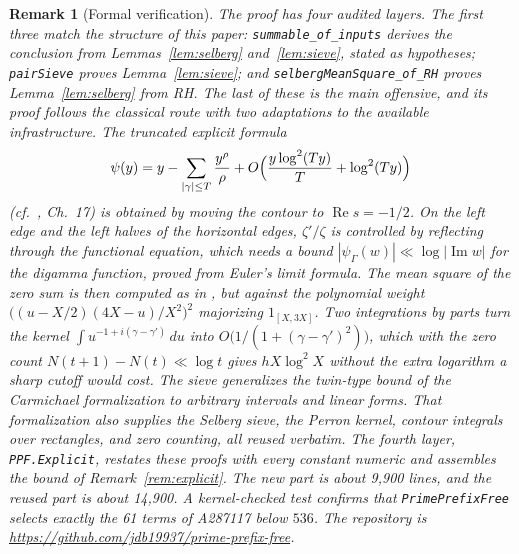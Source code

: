 \documentclass[11pt]{amsart}
\newtheorem{remark}[lemma]{Remark}
\begin{document}
\begin{remark}[Formal verification]
The proof has four audited layers. The first three match the structure
of this paper: \texttt{summable\_of\_inputs} derives the conclusion from
Lemmas~\ref{lem:selberg} and~\ref{lem:sieve}, stated as hypotheses;
\texttt{pairSieve} proves Lemma~\ref{lem:sieve}; and
\texttt{selbergMeanSquare\_of\_RH} proves Lemma~\ref{lem:selberg} from
RH. The last of these is the main offensive, and its proof follows the
classical route with two adaptations to the available infrastructure.
The truncated explicit formula
\[
\psi(y) = y - \sum_{|\gamma| \le T} \frac{y^\rho}{\rho} + O\Bigl(\frac{y
\log^2 (Ty)}{T} + \log^2(Ty)\Bigr)
\]
(cf.~\cite{Dav}, Ch.~17) is obtained by moving the contour to
$\operatorname{Re} s = -1/2$. On
the left edge and the left halves of the horizontal edges, $\zeta'/\zeta$
is controlled by reflecting through the functional equation, which needs
a bound $|\psi_\Gamma(w)| \ll \log |\operatorname{Im} w|$ for the
digamma function, proved from Euler's limit formula. The mean square of
the zero sum is then computed as in \cite{Sel}, but against the
polynomial weight $\bigl((u - X/2)(4X - u)/X^2\bigr)^2$ majorizing
$1_{[X, 3X]}$. Two integrations by parts turn the kernel
$\int u^{-1 + i(\gamma - \gamma')}\,du$ into $O\bigl(1/(1 + (\gamma -
\gamma')^2)\bigr)$, which with the zero count $N(t+1) - N(t) \ll \log t$
gives $h X \log^2 X$ without the extra logarithm a sharp cutoff would
cost. The sieve generalizes the twin-type bound of the Carmichael
formalization \cite{Bro} to arbitrary intervals and linear forms. That
formalization also supplies the Selberg sieve, the Perron kernel,
contour integrals over rectangles, and zero counting, all reused
verbatim. The fourth layer, \texttt{PPF.Explicit}, restates these proofs
with every constant numeric and assembles the bound of
Remark~\ref{rem:explicit}. The new part is about 9{,}900 lines, and the
reused part is about 14{,}900. A kernel-checked test confirms that
\texttt{PrimePrefixFree} selects exactly the 61 terms of A287117 below
$536$. The repository is
\url{https://github.com/jdb19937/prime-prefix-free}.
\end{remark}
\end{document}

